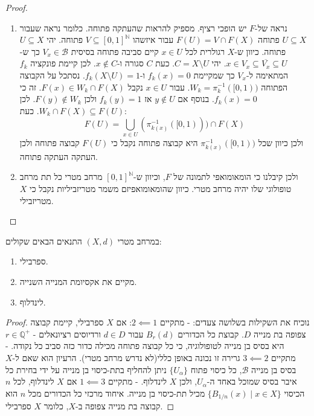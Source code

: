 \documentclass{tstextbook}
\begin{document}
\begin{proof}
\begin{enumerate}
    \item נראה של-\(F\) יש הופכי רציף. מספיק להראות שהעתקה פתוחה. כלומר נראה שעבור \(U\subseteq X\) פתוחה \(F(U)=V\cap F(X)\) עבור איזשהו \(V\subseteq [0,1]^{\mathbb{N}}\) פתוחה. יהי \(U\subseteq X\) פתוחה. כיוון ש-\(X\) רגולרית לכל \(x \in U\) קיים סביבה פתוחה בסיסית \(V_{x}\in \mathcal{B}\) כך ש-\(x \in V_x \subseteq \overline{V_x} \subseteq U\). יהי \(C = X \setminus U\). כעת \(C\) סגורה ו-\(x \not \in C\). לכן קיימת פונקציה \(f_{k}\) המתאימה ל-\(V_{x}\) כך שמקיימת \(f_{k}(x)=0\) ו-\(f_{k}\left( X\setminus U \right)=1\). נסתכל על הקבוצה הפתוחה \(W_k = \pi_k^{-1}([0, 1))\). עבור \(x \in U\) נקבל \(F(x)\in W_{k}\cap F(X)\). זה כי \(f_{k}(x)=0\). בנוסף אם \(y \not \in U\) אז \(f_{k}(y)=1\) ולכן \(F(y)\not \in W_{k}\). לכן \(W_{k}\cap F(X)\subseteq F(U)\). כעת: 
$$F(U) = \bigcup_{x \in U} (\pi_{k(x)}^{-1}([0, 1))) \cap F(X)$$
ולכן כיוון שכל \(\pi_{k(x)}^{-1}([0, 1))\) היא קבוצה פתוחה נקבל כי \(F(U)\) קבוצה פתוחה ולכן העתקה העתקה פתוחה.


    \item ולכן קיבלנו כי הומאומואפי לתמונה של \(F\), וכיוון ש-\([0,1]^{\mathbb{N}}\) מרחב מטרי כל תת מרחב טופולוגי שלו יהיה מרחב מטרי. כיוון שהומאומואפיזם משמר מטריזביליות נקבל כי \(X\) מטריזבילי. 


  \end{enumerate}
\end{proof}
\begin{proposition}
במרחב מטרי \((X,d)\) התנאים הבאים שקולים:

  \begin{enumerate}
    \item ספרבילי. 


    \item מקיים את אקסיומת המנייה השנייה. 


    \item לינדלוף. 


  \end{enumerate}
\end{proposition}
\begin{proof}
נוכיח את השקילות בשלושה צעדים:
- מתקיים \(2\impliedby 1\): אם \(X\) ספרבילי, קיימת קבוצה צפופה בת מנייה \(D\). קבוצת כל הכדורים \(B_r(d)\) עבור \(d \in D\) ורדיוסים רציונאלים - \(r \in \mathbb{Q}^+\) היא בסיס בן מנייה לטופולוגיה, כי כל קבוצה פתוחה מכילה כדור כזה סביב כל נקודה.
- מתקיים \(3\impliedby 2\)  גרירה זו נכונה באופן כללי(לא נדרש מרחב מטרי). הרעיון הוא שאם ל-\(X\) בסיס בן מנייה \(\mathcal{B}\), כל כיסוי פתוח \(\{U_\alpha\}\) ניתן להחליף בתת-כיסוי בן מנייה על ידי בחירת כל איבר בסיס שמוכל באחד ה-\(U_\alpha\), ולכן \(X\) לינדלוף.
- מתקיים \(1\impliedby 3\) אם \(X\) לינדלוף, לכל \(n\) הכיסוי \(\{B_{1/n}(x)\mid x\in X\}\) מכיל תת-כיסוי בן מנייה. איחוד מרכזי כל הכדורים מכל \(n\) הוא קבוצה בת מנייה צפופה ב-\(X\), כלומר \(X\) ספרבילי.

\end{proof}
\end{document}
